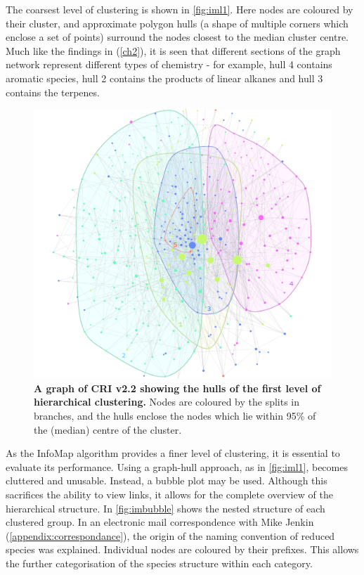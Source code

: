 The coarsest level of clustering is shown in \autoref{fig:iml1}. Here nodes are coloured by their cluster, and approximate polygon hulls (a shape of multiple corners which enclose a set of points) surround the nodes closest to the median cluster centre. Much like the findings in (\autoref{ch2}), it is seen that different sections of the graph network represent different types of chemistry - for example, hull 4 contains aromatic species, hull 2 contains the products of linear alkanes and hull 3 contains the terpenes.


\begin{figure}[H]
  \centering
  \includegraphics[width=\textwidth]{fig/crigroups.png}
  \caption{\textbf{A graph of CRI v2.2 showing the hulls of the first level of hierarchical clustering.} Nodes are coloured by the splits in branches, and the hulls enclose the nodes which lie within 95\% of the (median) centre of the cluster.}
    \label{fig:iml1}
\end{figure}

As the InfoMap algorithm provides a finer level of clustering, it is essential to evaluate its performance. Using a graph-hull approach, as in \autoref{fig:iml1}, becomes cluttered and unusable. Instead, a bubble plot may be used. Although this sacrifices the ability to view links, it allows for the complete overview of the hierarchical structure. In \autoref{fig:imbubble} shows the nested structure of each clustered group. In an electronic mail correspondence with Mike Jenkin (\autoref{appendix:correspondance}), the origin of the naming convention of reduced species was explained. Individual nodes are coloured by their prefixes. This allows the further categorisation of the species structure within each category.

